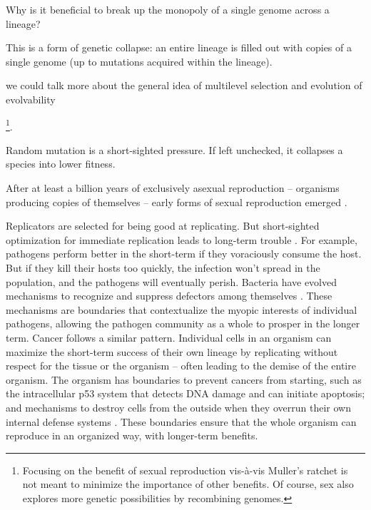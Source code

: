 Why is it beneficial to break up the monopoly of a single genome across a lineage?

This is a form of genetic collapse: an entire lineage is filled out with copies of a single genome (up to mutations acquired within the lineage). 

we could talk more about the general idea of multilevel selection and evolution of evolvability

\footnote{Focusing on the benefit of sexual reproduction vis-à-vis Muller's ratchet is not meant to minimize the importance of other benefits. Of course, sex also explores more genetic possibilities by recombining genomes.}.


Random mutation is a short-sighted pressure. If left unchecked, it collapses a species into lower fitness.

After at least a billion years of exclusively asexual reproduction -- organisms producing copies of themselves -- early forms of sexual reproduction emerged \citep{cavalier2002origins}. 

Replicators are selected for being good at replicating. But short-sighted optimization for immediate replication leads to long-term trouble \citep{dawkins1976selfish, traulsen2006evolution, wilson1980natural, wagner1996perspective}. For example, pathogens perform better in the short-term if they voraciously consume the host. But if they kill their hosts too quickly, the infection won't spread in the population, and the pathogens will eventually perish. Bacteria have evolved mechanisms to recognize and suppress defectors among themselves \citep{west2006social}. These mechanisms are boundaries that contextualize the myopic interests of individual pathogens, allowing the pathogen community as a whole to prosper in the longer term. Cancer follows a similar pattern. Individual cells in an organism can maximize the short-term success of their own lineage by replicating without respect for the tissue or the organism -- often leading to the demise of the entire organism. The organism has boundaries to prevent cancers from starting, such as the intracellular p53 system that detects DNA damage and can initiate apoptosis; and mechanisms to destroy cells from the outside when they overrun their own internal defense systems \citep{hanahan2000hallmarks, schreiber2011cancer}. These boundaries ensure that the whole organism can reproduce in an organized way, with longer-term benefits.


 
